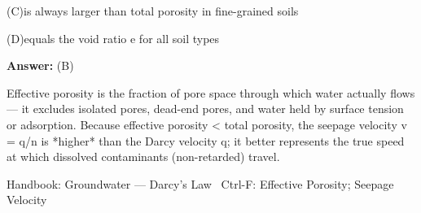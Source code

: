 \documentclass[11pt]{article}
\newcommand{\optline}[2]{\par\noindent\hspace{1.2em}(#1)\hspace{0.6em}#2}
\begin{document}
\optline{C}{is always larger than total porosity in fine-grained soils}
\optline{D}{equals the void ratio e for all soil types}
\par\vspace{3pt}
\vspace{2pt}\par\noindent\colorbox{boxbg}{\parbox{\dimexpr\linewidth-2\fboxsep\relax}{%
\vspace{2pt}\textbf{Answer:} (B)\par\vspace{2pt}
{\small Effective porosity is the fraction of pore space through which water actually flows --- it excludes isolated pores, dead-end pores, and water held by surface tension or adsorption. Because effective porosity < total porosity, the seepage velocity v = q/n is *higher* than the Darcy velocity q; it better represents the true speed at which dissolved contaminants (non-retarded) travel.}\par\vspace{2pt}
{\footnotesize\color{soft}Handbook: Groundwater --- Darcy's Law \textbullet\ Ctrl-F: Effective Porosity; Seepage Velocity}\vspace{2pt}
}}
\vspace{9pt}
\end{document}
